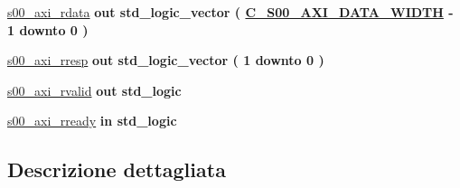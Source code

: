\begin{DoxyCompactItemize}
\item 
\hypertarget{group___a_x_i-device_gad2655fadb987e0487c428aca187b55d0}{\hyperlink{group___a_x_i-device_gad2655fadb987e0487c428aca187b55d0}{s00\+\_\+axi\+\_\+rdata}  {\bfseries {\bfseries \textcolor{vhdlchar}{out}\textcolor{vhdlchar}{ }}} {\bfseries \textcolor{vhdlchar}{std\+\_\+logic\+\_\+vector}\textcolor{vhdlchar}{ }\textcolor{vhdlchar}{(}\textcolor{vhdlchar}{ }\textcolor{vhdlchar}{ }\textcolor{vhdlchar}{ }\textcolor{vhdlchar}{ }{\bfseries \hyperlink{group___a_x_i-device_gafce7943994a4ddfa81f224225976a4c7}{C\+\_\+\+S00\+\_\+\+A\+X\+I\+\_\+\+D\+A\+T\+A\+\_\+\+W\+I\+D\+T\+H}} \textcolor{vhdlchar}{-\/}\textcolor{vhdlchar}{ } \textcolor{vhdldigit}{1} \textcolor{vhdlchar}{ }\textcolor{vhdlchar}{downto}\textcolor{vhdlchar}{ }\textcolor{vhdlchar}{ } \textcolor{vhdldigit}{0} \textcolor{vhdlchar}{ }\textcolor{vhdlchar}{)}\textcolor{vhdlchar}{ }} }\label{group___a_x_i-device_gad2655fadb987e0487c428aca187b55d0}

\item 
\hypertarget{group___a_x_i-device_ga1acee955f50f71e5595a03c6ca301cf0}{\hyperlink{group___a_x_i-device_ga1acee955f50f71e5595a03c6ca301cf0}{s00\+\_\+axi\+\_\+rresp}  {\bfseries {\bfseries \textcolor{vhdlchar}{out}\textcolor{vhdlchar}{ }}} {\bfseries \textcolor{vhdlchar}{std\+\_\+logic\+\_\+vector}\textcolor{vhdlchar}{ }\textcolor{vhdlchar}{(}\textcolor{vhdlchar}{ }\textcolor{vhdlchar}{ } \textcolor{vhdldigit}{1} \textcolor{vhdlchar}{ }\textcolor{vhdlchar}{downto}\textcolor{vhdlchar}{ }\textcolor{vhdlchar}{ } \textcolor{vhdldigit}{0} \textcolor{vhdlchar}{ }\textcolor{vhdlchar}{)}\textcolor{vhdlchar}{ }} }\label{group___a_x_i-device_ga1acee955f50f71e5595a03c6ca301cf0}

\item 
\hypertarget{group___a_x_i-device_gaf180911f7eb262e530e26865bc97aa0b}{\hyperlink{group___a_x_i-device_gaf180911f7eb262e530e26865bc97aa0b}{s00\+\_\+axi\+\_\+rvalid}  {\bfseries {\bfseries \textcolor{vhdlchar}{out}\textcolor{vhdlchar}{ }}} {\bfseries \textcolor{vhdlchar}{std\+\_\+logic}\textcolor{vhdlchar}{ }} }\label{group___a_x_i-device_gaf180911f7eb262e530e26865bc97aa0b}

\item 
\hypertarget{group___a_x_i-device_ga8b82eb165d7024f6c7b25646f6ebdd4d}{\hyperlink{group___a_x_i-device_ga8b82eb165d7024f6c7b25646f6ebdd4d}{s00\+\_\+axi\+\_\+rready}  {\bfseries {\bfseries \textcolor{vhdlchar}{in}\textcolor{vhdlchar}{ }}} {\bfseries \textcolor{vhdlchar}{std\+\_\+logic}\textcolor{vhdlchar}{ }} }\label{group___a_x_i-device_ga8b82eb165d7024f6c7b25646f6ebdd4d}

\begin{DoxyCompactList}\small\item\em \end{DoxyCompactList}\end{DoxyCompactItemize}


\subsection{Descrizione dettagliata}
